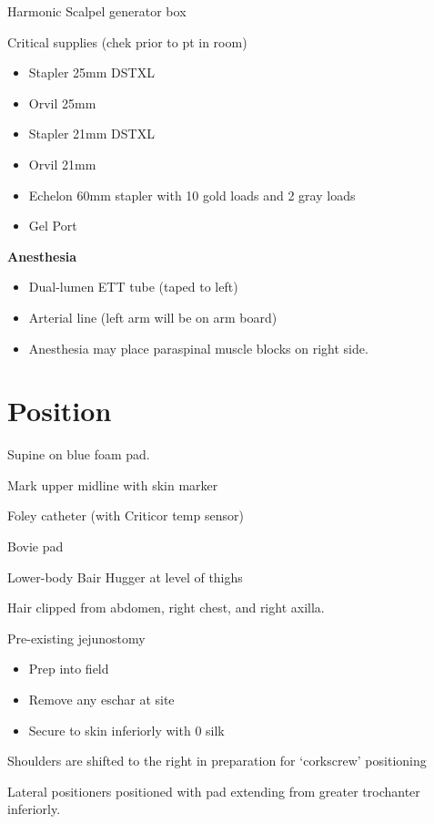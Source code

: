 \documentclass[
]{book}
\providecommand{\tightlist}{%
  \setlength{\itemsep}{0pt}\setlength{\parskip}{0pt}}
\begin{document}
Harmonic Scalpel generator box

Critical supplies (chek prior to pt in room)

\begin{itemize}
\tightlist
\item
  Stapler 25mm DSTXL
\item
  Orvil 25mm
\item
  Stapler 21mm DSTXL
\item
  Orvil 21mm
\item
  Echelon 60mm stapler with 10 gold loads and 2 gray loads
\item
  Gel Port
\end{itemize}

\newpage

\textbf{Anesthesia}

\begin{itemize}
\tightlist
\item
  Dual-lumen ETT tube (taped to left)
\item
  Arterial line (left arm will be on arm board)
\item
  Anesthesia may place paraspinal muscle blocks on right side.
\end{itemize}

\hypertarget{position}{%
\section{Position}\label{position}}

Supine on blue foam pad.

Mark upper midline with skin marker

Foley catheter (with Criticor temp sensor)

Bovie pad

Lower-body Bair Hugger at level of thighs

Hair clipped from abdomen, right chest, and right axilla.

Pre-existing jejunostomy

\begin{itemize}
\tightlist
\item
  Prep into field
\item
  Remove any eschar at site
\item
  Secure to skin inferiorly with 0 silk
\end{itemize}

Shoulders are shifted to the right in preparation for `corkscrew' positioning

Lateral positioners positioned with pad extending from greater trochanter inferiorly.
\end{document}
